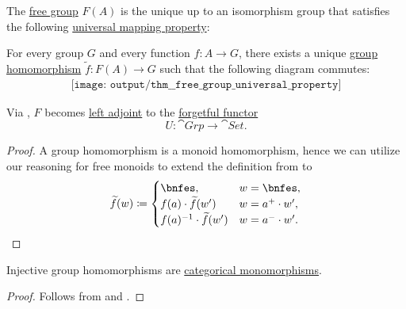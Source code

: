 \begin{theorem}\label{thm:free_group_universal_property}
  The \hyperref[def:free_group]{free group} \( F(A) \) is the unique up to an isomorphism group that satisfies the following \hyperref[rem:universal_mapping_property]{universal mapping property}:
  \begin{displayquote}
    For every group \( G \) and every function \( f: A \to G \), there exists a unique \hyperref[def:group/homomorphism]{group homomorphism} \( \widetilde{f}: F(A) \to G \) such that the following diagram commutes:
    \begin{equation}\label{eq:thm:free_group_universal_property/diagram}
      \begin{aligned}
        \texttt{[image: output/thm\_\_free\_group\_universal\_property]}
      \end{aligned}
    \end{equation}
  \end{displayquote}
\end{theorem}
\begin{comments}
  \item Via , \( F \) becomes \hyperref[def:category_adjunction]{left adjoint} to the \hyperref[def:concrete_category]{forgetful functor}
  \begin{equation*}
    U: \cat{Grp} \to \cat{Set}.
  \end{equation*}
\end{comments}
\begin{proof}
  A group homomorphism is a monoid homomorphism, hence we can utilize our reasoning for free monoids to extend the definition from  to
  \begin{equation*}
    \widetilde{f}(w) \coloneqq \begin{cases}
      \bnfes,                      &w = \bnfes, \\
      f(a) \cdot \widetilde{f}(w')      &w = a^+ \cdot w', \\
      f(a)^{-1} \cdot \widetilde{f}(w') &w = a^- \cdot w'.
    \end{cases}
  \end{equation*}
\end{proof}

\begin{corollary}\label{thm:injective_group_homomorphisms_are_monomorphisms}
  Injective group homomorphisms are \hyperref[def:morphism_invertibility/left_cancellative]{categorical monomorphisms}.
\end{corollary}
\begin{proof}
  Follows from  and .
\end{proof}

